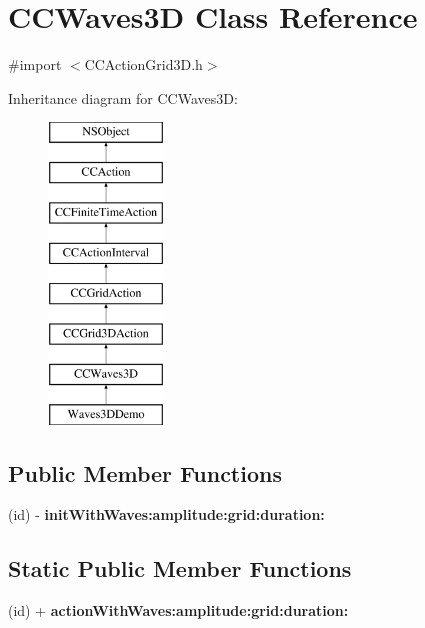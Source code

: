 \hypertarget{interface_c_c_waves3_d}{\section{C\-C\-Waves3\-D Class Reference}
\label{interface_c_c_waves3_d}
}


{\ttfamily \#import $<$C\-C\-Action\-Grid3\-D.\-h$>$}

Inheritance diagram for C\-C\-Waves3\-D\-:\begin{figure}[H]
\begin{center}
\leavevmode
\includegraphics[height=8.000000cm]{interface_c_c_waves3_d}
\end{center}
\end{figure}
\subsection*{Public Member Functions}
\begin{DoxyCompactItemize}
\item 
\hypertarget{interface_c_c_waves3_d_ac56abca08544dac4203702788561d839}{(id) -\/ {\bfseries init\-With\-Waves\-:amplitude\-:grid\-:duration\-:}}\label{interface_c_c_waves3_d_ac56abca08544dac4203702788561d839}

\end{DoxyCompactItemize}
\subsection*{Static Public Member Functions}
\begin{DoxyCompactItemize}
\item 
\hypertarget{interface_c_c_waves3_d_ac2f575108a701101974a8c25114ed305}{(id) + {\bfseries action\-With\-Waves\-:amplitude\-:grid\-:duration\-:}}\label{interface_c_c_waves3_d_ac2f575108a701101974a8c25114ed305}

\end{DoxyCompactItemize}
